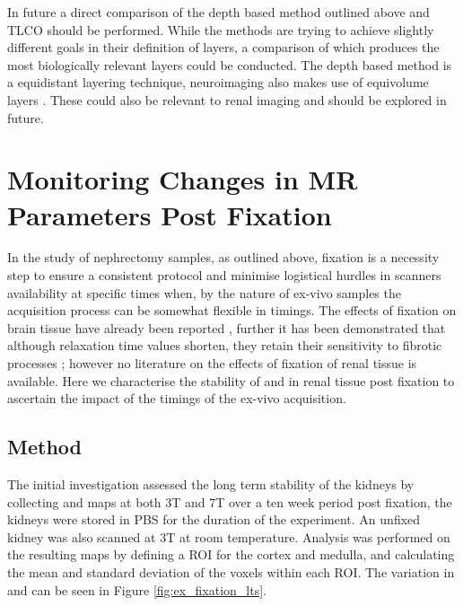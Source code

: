 In future a direct comparison of the depth based method outlined above and \ac{TLCO} should be performed. While the methods are trying to achieve slightly different goals in their definition of layers, a comparison of which produces the most biologically relevant layers could be conducted. The depth based method is a equidistant layering technique, neuroimaging also makes use of equivolume layers \cite{waehnert_anatomically_2014}. These could also be relevant to renal imaging and should be explored in future.

\section{Monitoring Changes in MR Parameters Post Fixation}
\label{sec:ex_tissue_fixation}
In the study of nephrectomy samples, as outlined above, fixation is a necessity step to ensure a consistent protocol and minimise logistical hurdles in scanners availability at specific times when, by the nature of ex-vivo samples the acquisition process can be somewhat flexible in timings. The effects of fixation on brain tissue have already been reported \cite{birkl_effects_2016, schmierer_quantitative_2008, shatil_quantitative_2018}, further it has been demonstrated that although relaxation time values shorten, they retain their sensitivity to fibrotic processes \cite{jafari_integrated_2021}; however no literature on the effects of fixation of renal tissue is available. Here we characterise the stability of \tone and \ttwostar in renal tissue post fixation to ascertain the impact of the timings of the ex-vivo acquisition.

\subsection{Method}
The initial investigation assessed the long term stability of the kidneys by collecting \tone and \ttwostar maps at both 3T and 7T over a ten week period post fixation, the kidneys were stored in \ac{PBS} for the duration of the experiment. An unfixed kidney was also scanned at 3T at room temperature. Analysis was performed on the resulting maps by defining a \ac{ROI} for the cortex and medulla, and calculating the mean and standard deviation of the voxels within each \ac{ROI}. The variation in \tone and \ttwostar can be seen in Figure \ref{fig:ex_fixation_lts}. 

